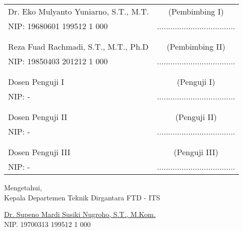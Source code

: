     \noindent
    \begin{tabularx}{\textwidth}{X c}
      Dr. Eko Mulyanto Yuniarno, S.T., M.T.		& (Pembimbing I) \\
      NIP: 19680601 199512 1 000        		& ................................... \\
      &  \\
      &  \\
      Reza Fuad Rachmadi, S.T., M.T., Ph.D		& (Pembimbing II) \\
      NIP: 19850403 201212 1 000        		& ................................... \\
      &  \\
      &  \\
      Dosen Penguji I					  		& (Penguji I) \\
      NIP: -   									& ................................... \\
      &  \\
      &  \\
      Dosen Penguji II					 		& (Penguji II) \\
      NIP: -					       			& ................................... \\
      &  \\
      &  \\
      Dosen Penguji III		             		& (Penguji III) \\
      NIP: -						      		& ................................... \\
    \end{tabularx}
  \endgroup

  \vspace{2ex}

  \begin{center}
    Mengetahui, \\
    Kepala Departemen Teknik Dirgantara FTD - ITS \\

    \vspace{8ex}

    \underline{Dr. Supeno Mardi Susiki Nugroho, S.T., M.Kom.} \\
    NIP. 19700313 199512 1 000
  \end{center}
\endgroup
